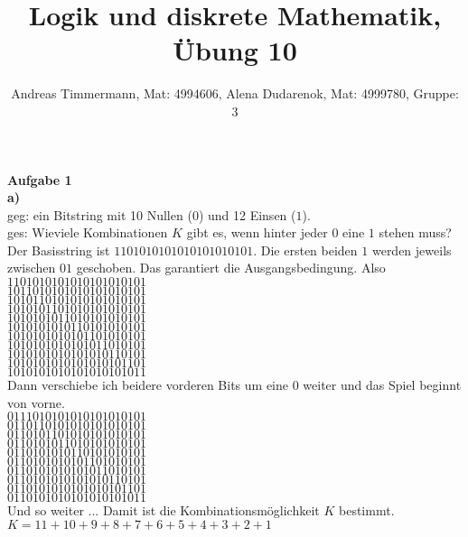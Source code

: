 \documentclass[a4paper]{scrartcl}
\title{Logik und diskrete Mathematik, Übung 10}
\author{Andreas Timmermann, Mat: 4994606, Alena Dudarenok, Mat: 4999780, Gruppe: 3}
\begin{document}
	\maketitle
	\begin{flushleft}
		\textbf{Aufgabe 1}\\

		\textbf{a)}\\
		geg: ein Bitstring mit 10 Nullen ($0$) und 12 Einsen ($1$).\\
		ges: Wieviele Kombinationen $K$ gibt es, wenn hinter jeder $0$ eine $1$ stehen muss?\\[1em]
		Der Basisstring ist $1101010101010101010101$. Die ersten beiden $1$ werden jeweils zwischen $01$ geschoben. Das garantiert die Ausgangsbedingung. Also \\[1em]
		$1101010101010101010101$\\
		$1011010101010101010101$\\
		$1010110101010101010101$\\
		$1010101101010101010101$\\
		$1010101011010101010101$\\
		$1010101010110101010101$\\
		$1010101010101101010101$\\
		$1010101010101011010101$\\
		$1010101010101010110101$\\
		$1010101010101010101101$\\
		$1010101010101010101011$\\[1em]
		Dann verschiebe ich beidere vorderen Bits um eine $0$ weiter und das Spiel beginnt von vorne.\\[1em]
		$0111010101010101010101$\\
		$0110110101010101010101$\\
		$0110101101010101010101$\\
		$0110101011010101010101$\\
		$0110101010110101010101$\\
		$0110101010101101010101$\\
		$0110101010101011010101$\\
		$0110101010101010110101$\\
		$0110101010101010101101$\\
		$0110101010101010101011$\\[1em]
		Und so weiter ... Damit ist die Kombinationsmöglichkeit $K$ bestimmt.\\
		$K=11+10+9+8+7+6+5+4+3+2+1$\\[1em]


\end{flushleft}
\end{document}
